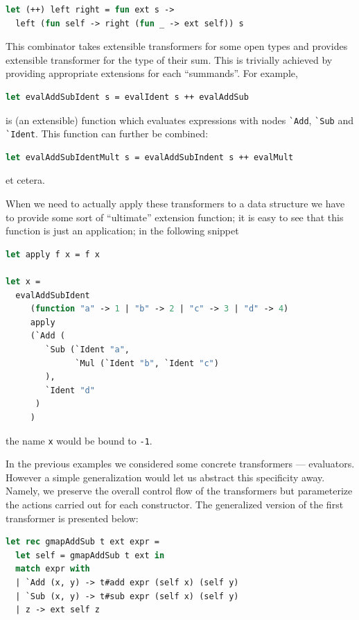 \begin{lstlisting}[language=ocaml]
let (++) left right = fun ext s -> 
  left (fun self -> right (fun _ -> ext self)) s
\end{lstlisting}

This combinator takes extensible transformers for some open types and provides extensible transformer 
for the type of their sum. This is trivially achieved by providing appropriate extensions for each ``summands''.
For example,

\begin{lstlisting}[language=ocaml]
let evalAddSubIdent s = evalIdent s ++ evalAddSub
\end{lstlisting}

is (an extensible) function which evaluates expressions with nodes \lstinline{`Add}, \lstinline{`Sub} and
\lstinline{`Ident}. This function can further be combined:

\begin{lstlisting}[language=ocaml]
let evalAddSubIdentMult s = evalAddSubIndent s ++ evalMult
\end{lstlisting}

et cetera. 

When we need to actually apply these transformers to a data structure we have to provide
some sort of ``ultimate'' extension function; it is easy to see that this function is just
an application; in the following snippet

\begin{lstlisting}[language=ocaml]
let apply f x = f x

let x = 
  evalAddSubIdent 
     (function "a" -> 1 | "b" -> 2 | "c" -> 3 | "d" -> 4)
     apply 
     (`Add (
        `Sub (`Ident "a", 
              `Mul (`Ident "b", `Ident "c")
        ), 
        `Ident "d"
      )
     )
\end{lstlisting}

the name \lstinline{x} would be bound to \lstinline{-1}.

In the previous examples we considered some concrete transformers --- evaluators.
However a simple generalization would let us abstract this specificity away. Namely, 
we preserve the overall control flow of the transformers but parameterize the
actions carried out for each constructor. The generalized version of the first 
transformer is presented below:

\begin{lstlisting}[language=ocaml]
let rec gmapAddSub t ext expr =
  let self = gmapAddSub t ext in
  match expr with
  | `Add (x, y) -> t#add expr (self x) (self y)
  | `Sub (x, y) -> t#sub expr (self x) (self y)
  | z -> ext self z
\end{lstlisting}

